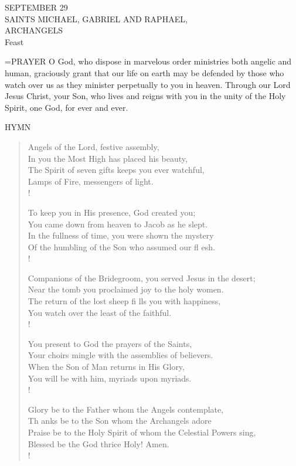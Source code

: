 \begin{center}\normalsize SEPTEMBER 29\\
\footnotesize SAINTS MICHAEL, GABRIEL AND RAPHAEL,\\
\footnotesize ARCHANGELS\\
\footnotesize Feast\\
\end{center}

\hangindent=\parindent \small{PRAYER 
O God, who dispose in marvelous order
ministries both angelic and human,
graciously grant
that our life on earth may be defended
by those who watch over us
as they minister perpetually to you in heaven.
Through our Lord Jesus Christ, your Son,
who lives and reigns with you in the unity of the Holy Spirit,
one God, for ever and ever.\\}
 
\noindent\small{\uppercase{Hymn}}\normalsize\label{archangels:hymn}
\begin{verse}
Angels of the Lord, festive assembly,\\
In you the Most High has placed his beauty,\\
The Spirit of seven gifts keeps you ever watchful,\\
Lamps of Fire, messengers of light.\\!

To keep you in His presence, God created you;\\
You came down from heaven to Jacob as he slept.\\
In the fullness of time, you were shown the mystery\\
Of the humbling of the Son who assumed our fl esh.\\!

Companions of the Bridegroom, you served Jesus in the desert;\\
Near the tomb you proclaimed joy to the holy women.\\
The return of the lost sheep fi lls you with happiness,\\
You watch over the least of the faithful.\\!

You present to God the prayers of the Saints,\\
Your choirs mingle with the assemblies of believers.\\
When the Son of Man returns in His Glory,\\
You will be with him, myriads upon myriads.\\!

Glory be to the Father whom the Angels contemplate,\\
Th anks be to the Son whom the Archangels adore\\
Praise be to the Holy Spirit of whom the Celestial Powers sing,\\
Blessed be the God thrice Holy! Amen.\\!
\end{verse}

